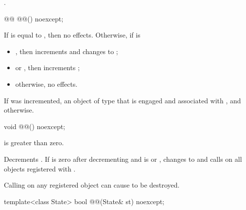 \begin{itemdescr}
\pnum
\returns
{}.
\end{itemdescr}

%
\begin{itemdecl}
@@ @@() noexcept;
\end{itemdecl}

\begin{itemdescr}
\pnum
\effects
If  is equal to , then no effects.
Otherwise, if  is
\begin{itemize}
\item
{},
then increments  and changes  to ;
\item
{} or ,
then increments ;
\item
otherwise, no effects.
\end{itemize}

\pnum
\returns
If  was incremented,
an object of type 
that is engaged and associated with , and
 otherwise.
\end{itemdescr}

%
\begin{itemdecl}
void @@() noexcept;
\end{itemdecl}

\begin{itemdescr}
\pnum
\expects
{} is greater than zero.

\pnum
\effects
Decrements .
If  is zero after decrementing and
 is  or ,
changes  to  and
calls  on all objects registered with .
\begin{note}
Calling  on any registered object
can cause  to be destroyed.
\end{note}
\end{itemdescr}

%
\begin{itemdecl}
template<class State>
  bool @@(State& st) noexcept;
\end{itemdecl}

